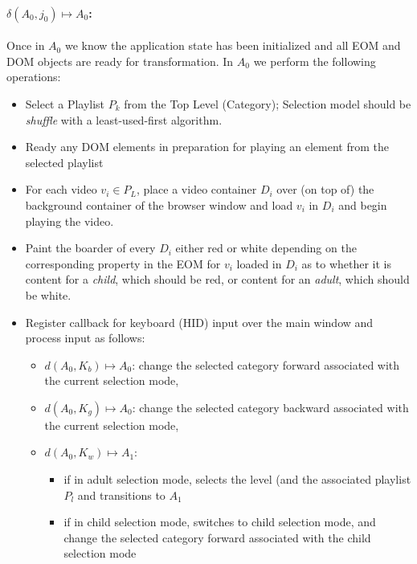\documentclass[10pt]{article}
\begin{document}
\paragraph{$\delta(A_{0}, j_{0}) \mapsto A_{0}$:}

Once in $A_{0}$ we know the application state has been initialized and all EOM and DOM objects are ready for transformation. In $A_{0}$ we perform the following operations:

\begin{itemize}
	\item Select a Playlist $P_{k}$ from the Top Level (Category);  Selection model should be \emph{shuffle} with a least-used-first algorithm.
	\item Ready any DOM elements in preparation for playing an element from the selected playlist
	\item For each video $v_{i} \in P_{L}$, place a video container $D_{i}$ over (on top of) the background container of the browser window and load $v_{i}$ in $D_{i}$ and begin playing the video.
	\item Paint the boarder of every $D_{i}$ either red or white depending on the corresponding property in the EOM for $v_{i}$ loaded in $D_{i}$ as to whether it is content for a \emph{child\/}, which should be red, or content for an \emph{adult\/}, which should be white.
	\item Register callback for keyboard (HID) input over the main window and process input as follows:
	\begin{itemize}
		\item $d(A_{0}, K_{b}) \mapsto A_{0}$: change the selected category forward associated with the current selection mode,
		\item $d(A_{0}, K_{g}) \mapsto A_{0}$: change the selected category backward associated with the current selection mode,
		\item $d(A_{0}, K_{w}) \mapsto A_{1}$: 
		\begin{itemize}
			\item if in adult selection mode, selects the level (and the associated playlist $P_{l}$ and transitions to $A_{1}$
			\item if in child selection mode, switches to child selection mode, and change the selected category forward associated with the child selection mode
		\end{itemize}
	\end{itemize}
\end{itemize}
\end{document}
